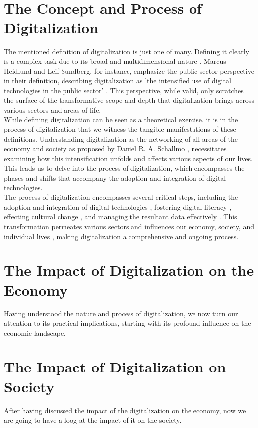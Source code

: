 \documentclass[12pt]{article}
\begin{document}
\section{The Concept and Process of Digitalization}
The mentioned definition of digitalization is just one of many. Defining it clearly is a complex task due to its broad and multidimensional nature \cite{JasonBloomberg.2018}. Marcus Heidlund and Leif Sundberg, for instance, emphasize the public sector perspective in their definition, describing digitalization as 'the intensified use of digital technologies in the public sector' \cite{Heidlund.2023}. This perspective, while valid, only scratches the surface of the transformative scope and depth that digitalization brings across various sectors and areas of life. \\
While defining digitalization can be seen as a theoretical exercise, it is in the process of digitalization that we witness the tangible manifestations of these definitions. Understanding digitalization as  the networking of all areas of the economy and society as proposed by Daniel R. A. Schallmo \cite{Schallmo.}, necessitates examining how this intensification unfolds and affects various aspects of our lives. This leads us to delve into the process of digitalization, which encompasses the phases and shifts that accompany the adoption and integration of digital technologies. \\
The process of digitalization encompasses several critical steps, including the adoption and integration of digital technologies \cite{GablerWirtschaftslexikon.5312023}, fostering digital literacy \cite{vanAckeren.2019}, effecting cultural change \cite{Nevmatulina.2022}, and managing the resultant data effectively \cite{DORDUNCU.2021}. This transformation permeates various sectors and influences our economy, society, and individual lives \cite{HenningHummert.2018}, making digitalization a comprehensive and ongoing process.

\section{The Impact of Digitalization on the Economy}
Having understood the nature and process of digitalization, we now turn our attention to its practical implications, starting with its profound influence on the economic landscape. \\

\section{The Impact of Digitalization on Society}
After having discussed the impact of the digitalization on the economy, now we are going to have a loog at the impact of it on the society. \\
\end{document}
